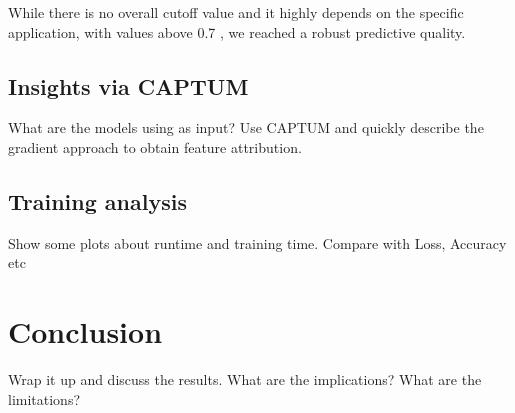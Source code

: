\documentclass[conference]{IEEEtran}
\begin{document}
While there is no overall cutoff value and it highly depends on the specific application, with values above 0.7 \cite{Hosmer2013}, we reached a robust predictive quality.

\subsection{Insights via CAPTUM}%
What are the models using as input? Use CAPTUM and quickly describe the gradient approach to obtain feature attribution. \cite{Kokhlikyan2020}


\subsection{Training analysis}%
Show some plots about runtime and training time. Compare with Loss, Accuracy etc

\section{Conclusion}
Wrap it up and discuss the results. What are the implications? What are the limitations?


\end{document}
